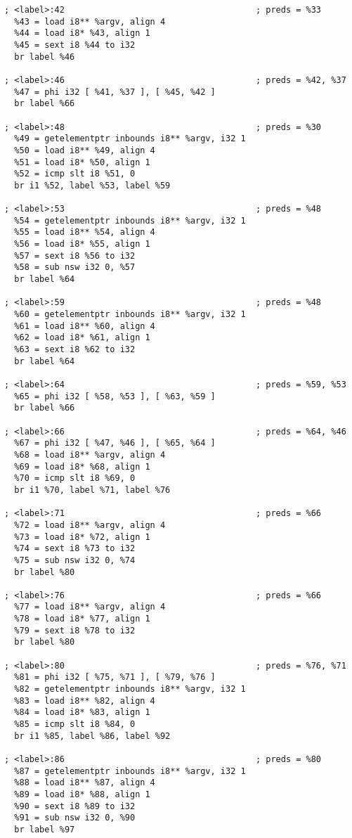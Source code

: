 \begin{lstlisting}[caption={Intermediate Representation from LLVM.}, label={lst:llvmir}]
; <label>:42                                      ; preds = %33
  %43 = load i8** %argv, align 4
  %44 = load i8* %43, align 1
  %45 = sext i8 %44 to i32
  br label %46

; <label>:46                                      ; preds = %42, %37
  %47 = phi i32 [ %41, %37 ], [ %45, %42 ]
  br label %66

; <label>:48                                      ; preds = %30
  %49 = getelementptr inbounds i8** %argv, i32 1
  %50 = load i8** %49, align 4
  %51 = load i8* %50, align 1
  %52 = icmp slt i8 %51, 0
  br i1 %52, label %53, label %59

; <label>:53                                      ; preds = %48
  %54 = getelementptr inbounds i8** %argv, i32 1
  %55 = load i8** %54, align 4
  %56 = load i8* %55, align 1
  %57 = sext i8 %56 to i32
  %58 = sub nsw i32 0, %57
  br label %64

; <label>:59                                      ; preds = %48
  %60 = getelementptr inbounds i8** %argv, i32 1
  %61 = load i8** %60, align 4
  %62 = load i8* %61, align 1
  %63 = sext i8 %62 to i32
  br label %64

; <label>:64                                      ; preds = %59, %53
  %65 = phi i32 [ %58, %53 ], [ %63, %59 ]
  br label %66

; <label>:66                                      ; preds = %64, %46
  %67 = phi i32 [ %47, %46 ], [ %65, %64 ]
  %68 = load i8** %argv, align 4
  %69 = load i8* %68, align 1
  %70 = icmp slt i8 %69, 0
  br i1 %70, label %71, label %76

; <label>:71                                      ; preds = %66
  %72 = load i8** %argv, align 4
  %73 = load i8* %72, align 1
  %74 = sext i8 %73 to i32
  %75 = sub nsw i32 0, %74
  br label %80

; <label>:76                                      ; preds = %66
  %77 = load i8** %argv, align 4
  %78 = load i8* %77, align 1
  %79 = sext i8 %78 to i32
  br label %80

; <label>:80                                      ; preds = %76, %71
  %81 = phi i32 [ %75, %71 ], [ %79, %76 ]
  %82 = getelementptr inbounds i8** %argv, i32 1
  %83 = load i8** %82, align 4
  %84 = load i8* %83, align 1
  %85 = icmp slt i8 %84, 0
  br i1 %85, label %86, label %92

; <label>:86                                      ; preds = %80
  %87 = getelementptr inbounds i8** %argv, i32 1
  %88 = load i8** %87, align 4
  %89 = load i8* %88, align 1
  %90 = sext i8 %89 to i32
  %91 = sub nsw i32 0, %90
  br label %97


\end{lstlisting}

